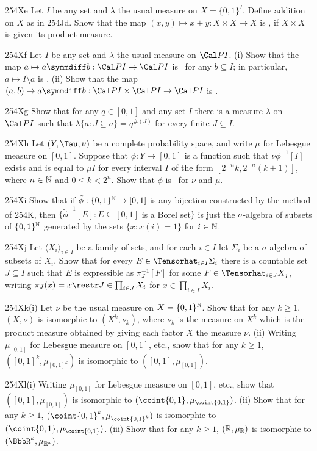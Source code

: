{\sqheader 254Xe Let $I$ be any set and $\lambda$ the usual measure on
$X=\{0,1\}^I$.   Define addition on $X$ as in 254Jd.   Show that
the map $(x,y)\mapsto x+y:X\times X\to X$ is \imp, if $X\times X$ is
given its product measure.

\sqheader 254Xf Let $I$ be any set and $\lambda$ the usual measure on
$\Cal PI$.   (i) Show that the map
$a\mapsto a\symmdiff b:\Cal PI\to\Cal PI$ is \imp\ for any
$b\subseteq I$;  in particular, $a\mapsto I\setminus a$ is \imp.  (ii)
Show that the map
$(a,b)\mapsto a\symmdiff b:\Cal PI\times\Cal PI\to\Cal PI$ is \imp.

\sqheader 254Xg Show that for any $q\in[0,1]$ and any set $I$ there is a
measure $\lambda$ on $\Cal PI$ such that
$\lambda\{a:J\subseteq a\}=q^{\#(J)}$ for every finite $J\subseteq I$.

\sqheader 254Xh Let $(Y,\Tau,\nu)$ be a complete probability
space, and write $\mu$ for Lebesgue measure on $[0,1]$.   Suppose that
$\phi:Y\to[0,1]$ is a function such that $\nu\phi^{-1}[I]$ exists and is
equal to $\mu I$ for every interval $I$ of the form
$[2^{-n}k,2^{-n}(k+1)]$, where $n\in\Bbb N$ and $0\le k<2^n$.   Show
that $\phi$ is \imp\ for $\nu$ and $\mu$.

\spheader 254Xi Show that if $\tilde\phi:\{0,1\}^{\Bbb N}\to[0,1]$ is
any bijection constructed by the method of 254K, then
$\{\tilde\phi^{-1}[E]:E\subseteq[0,1]$ is a Borel set$\}$ is just the
$\sigma$-algebra of subsets of $\{0,1\}^{\Bbb N}$ generated by the sets
$\{x:x(i)=1\}$ for $i\in\Bbb N$.

\spheader 254Xj Let $\langle X_i\rangle_{i\in I}$ be a family of
sets, and for each $i\in I$ let $\Sigma_i$ be a $\sigma$-algebra of
subsets of $X_i$.   Show that for every
$E\in\Tensorhat_{i\in I}\Sigma_i$ there is a countable set
$J\subseteq I$ such that $E$ is
expressible as $\pi_J^{-1}[F]$ for some $F\in\Tensorhat_{i\in J}X_j$,
writing $\pi_J(x)=x\restr J\in\prod_{i\in J}X_i$ for
$x\in\prod_{i\in I}X_i$.

\spheader 254Xk(i) Let $\nu$ be the usual measure on
$X=\{0,1\}^{\Bbb N}$.   Show that for any $k\ge 1$, $(X,\nu)$ is
isomorphic to $(X^k,\nu_k)$, where $\nu_k$ is the measure on $X^k$ which
is the product measure obtained by giving each factor $X$ the measure
$\nu$.    (ii) Writing $\mu_{[0,1]}$ for Lebesgue measure on
$[0,1]$, etc., show that for any $k\ge 1$, $([0,1]^k,\mu_{[0,1]^k})$ is
isomorphic to $([0,1],\mu_{[0,1]})$.

\spheader 254Xl(i) Writing $\mu_{[0,1]}$ for Lebesgue measure on
$[0,1]$, etc., show that $([0,1],\mu_{[0,1]})$ is isomorphic to
$(\coint{0,1},\mu_{\coint{0,1}})$.    (ii) Show that for any $k\ge
1$, $(\coint{0,1}^k,\mu_{\coint{0,1}^k})$ is isomorphic to
$(\coint{0,1},\mu_{\coint{0,1}})$.   (iii) Show that for any $k\ge
1$, $(\Bbb R,\mu_{\Bbb R})$ is isomorphic to $(\BbbR^k,\mu_{\Bbb
R^k})$.

}
